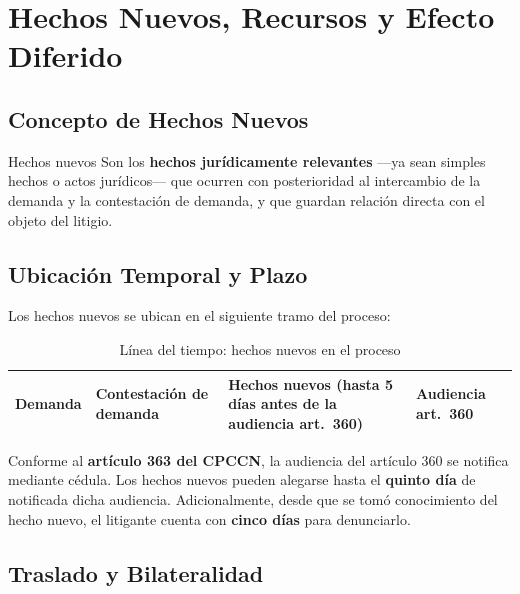 \documentclass[12pt,oneside]{book}
\begin{document}
\chapter{Hechos Nuevos, Recursos y Efecto Diferido}

\section{Concepto de Hechos Nuevos}

\begin{definition}{Hechos nuevos}
Son los \textbf{hechos jurídicamente relevantes} —ya sean simples hechos o actos jurídicos— que ocurren con posterioridad al intercambio de la demanda y la contestación de demanda, y que guardan relación directa con el objeto del litigio.
\end{definition}

\section{Ubicación Temporal y Plazo}

Los hechos nuevos se ubican en el siguiente tramo del proceso:

\begin{table}[H]
\centering
\begin{tabularx}{\textwidth}{
    >{\centering\arraybackslash}X
    >{\centering\arraybackslash}X
    >{\centering\arraybackslash\bfseries}X
    >{\centering\arraybackslash}X
}
\toprule
Demanda & Contestación de demanda & Hechos nuevos (hasta 5 días antes de la audiencia art.\ 360) & Audiencia art.\ 360 \\
\bottomrule
\end{tabularx}
\caption{Línea del tiempo: hechos nuevos en el proceso}
\end{table}

\begin{important}
Conforme al \textbf{artículo 363 del CPCCN}, la audiencia del artículo 360 se notifica mediante cédula. Los hechos nuevos pueden alegarse hasta el \textbf{quinto día} de notificada dicha audiencia. Adicionalmente, desde que se tomó conocimiento del hecho nuevo, el litigante cuenta con \textbf{cinco días} para denunciarlo.
\end{important}

\section{Traslado y Bilateralidad}
\end{document}
